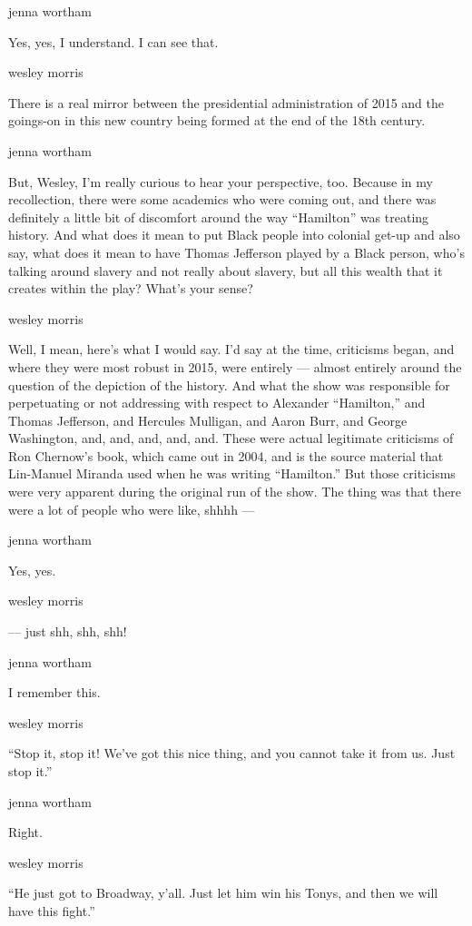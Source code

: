 jenna wortham

Yes, yes, I understand. I can see that.

wesley morris

There is a real mirror between the presidential administration of 2015
and the goings-on in this new country being formed at the end of the
18th century.

jenna wortham

But, Wesley, I'm really curious to hear your perspective, too. Because
in my recollection, there were some academics who were coming out, and
there was definitely a little bit of discomfort around the way
``Hamilton'' was treating history. And what does it mean to put Black
people into colonial get-up and also say, what does it mean to have
Thomas Jefferson played by a Black person, who's talking around slavery
and not really about slavery, but all this wealth that it creates within
the play? What's your sense?

wesley morris

Well, I mean, here's what I would say. I'd say at the time, criticisms
began, and where they were most robust in 2015, were entirely --- almost
entirely around the question of the depiction of the history. And what
the show was responsible for perpetuating or not addressing with respect
to Alexander ``Hamilton,'' and Thomas Jefferson, and Hercules Mulligan,
and Aaron Burr, and George Washington, and, and, and, and, and. These
were actual legitimate criticisms of Ron Chernow's book, which came out
in 2004, and is the source material that Lin-Manuel Miranda used when he
was writing ``Hamilton.'' But those criticisms were very apparent during
the original run of the show. The thing was that there were a lot of
people who were like, shhhh ---

jenna wortham

Yes, yes.

wesley morris

--- just shh, shh, shh!

jenna wortham

I remember this.

wesley morris

``Stop it, stop it! We've got this nice thing, and you cannot take it
from us. Just stop it.''

jenna wortham

Right.

wesley morris

``He just got to Broadway, y'all. Just let him win his Tonys, and then
we will have this fight.''

